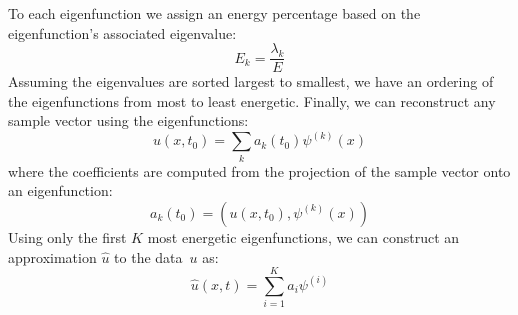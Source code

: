 To each eigenfunction we assign an energy percentage based on
the eigenfunction's associated eigenvalue:
\begin{equation}
E_k = \frac{\lambda_k}{E}
\label{energy_pc}
\end{equation}
Assuming the eigenvalues are sorted largest to smallest, we have an
ordering of the eigenfunctions from most to least energetic.
Finally, we can reconstruct any sample vector using the eigenfunctions:
\begin{equation}
u(x,t_0) =  \sum_k {a_k(t_0) \psi^{(k)}(x)}
\end{equation}            
where the coefficients are computed from the projection of the sample vector
onto an eigenfunction:
\begin{equation}
a_k(t_0) = ( u(x,t_0), \psi^{(k)}(x))
\label{data_coef}
\end{equation}
Using only the first $K$ most energetic eigenfunctions, we 
can construct an approximation $\hat{u}$ to the data~$u$ as:
\begin{equation}
\hat{u}(x,t) =  \sum_{i=1}^K{a_i {\psi}^{(i)}}
\label{approx_eqn}
\end{equation}

